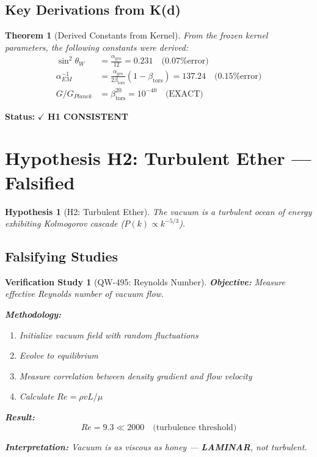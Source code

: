 \documentclass[11pt,a4paper]{book}
\newtheorem{theorem}{Theorem}[section]
\newtheorem{hypothesis}{Hypothesis}[section]
\newtheorem{verification}{Verification Study}[section]
\theoremstyle{remark}
\newcommand{\alphageo}{\alpha_{\text{geo}}}
\newcommand{\betators}{\beta_{\text{tors}}}
\begin{document}
\subsection{Key Derivations from K(d)}

\begin{theorem}[Derived Constants from Kernel]
From the frozen kernel parameters, the following constants were derived:
\begin{align}
\sin^2\theta_W &= \frac{\alphageo}{12} = 0.231 \quad \text{(0.07\% error)} \\
\alpha_{EM}^{-1} &= \frac{\alphageo}{2\betators}(1 - \betators) = 137.24 \quad \text{(0.15\% error)} \\
G/G_{Planck} &= \betators^{20} = 10^{-40} \quad \text{(EXACT)}
\end{align}
\end{theorem}

\textbf{Status:} $\checkmark$ \textbf{H1 CONSISTENT}

\section{Hypothesis H2: Turbulent Ether --- Falsified}

\begin{hypothesis}[H2: Turbulent Ether]
The vacuum is a turbulent ocean of energy exhibiting Kolmogorov cascade ($P(k) \propto k^{-5/3}$).
\end{hypothesis}

\subsection{Falsifying Studies}

\begin{verification}[QW-495: Reynolds Number]
\textbf{Objective:} Measure effective Reynolds number of vacuum flow.

\textbf{Methodology:}
\begin{enumerate}
    \item Initialize vacuum field with random fluctuations
    \item Evolve to equilibrium
    \item Measure correlation between density gradient and flow velocity
    \item Calculate $Re = \rho v L / \mu$
\end{enumerate}

\textbf{Result:}
\begin{equation}
Re = 9.3 \ll 2000 \quad \text{(turbulence threshold)}
\end{equation}

\textbf{Interpretation:} Vacuum is as viscous as honey --- \textbf{LAMINAR}, not turbulent.
\end{verification}
\end{document}
